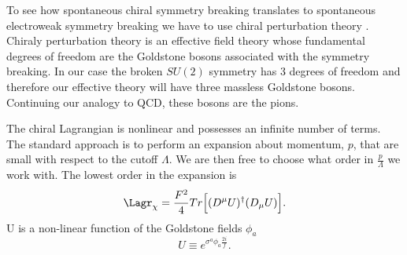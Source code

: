To see how spontaneous chiral symmetry breaking translates to spontaneous electroweak symmetry breaking we have to use chiral perturbation theory \cite{Gasser:1983yg,Golterman:2009kw}.
Chiraly perturbation theory is an effective field theory whose fundamental degrees of freedom are the Goldstone bosons associated with the symmetry breaking.
In our case the broken $SU(2)$ symmetry has 3 degrees of freedom and therefore our effective theory will have three massless Goldstone bosons.
Continuing our analogy to QCD, these bosons are the pions.

The chiral Lagrangian is nonlinear and possesses an infinite number of terms.
The standard approach is to perform an expansion about momentum, $p$, that are small with respect to the cutoff $\Lambda$.
We are then free to choose what order in $\frac{p}{\Lambda}$ we work with.
The lowest order in the expansion is
\begin{equation}
  \Lagr_{\chi}=\frac{F^2}{4}Tr\Big[(D^\mu U)^\dagger(D_\mu U)\Big].
\end{equation}
U is a non-linear function of the Goldstone fields $\phi_a$
\begin{equation}
  U\equiv e^{\sigma^a\phi_a\frac{2i}{f}}.
\end{equation}

